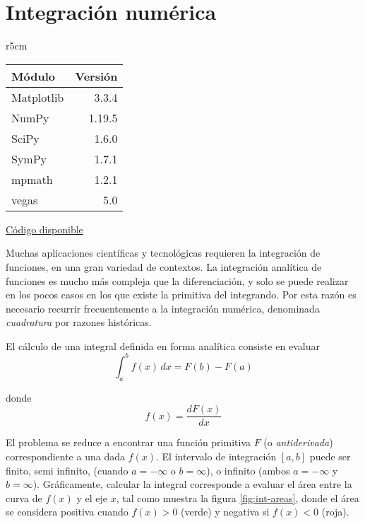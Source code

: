 

\chapter{Integración numérica} \label{ch:integracion}   

\begin{wraptable}{r}{5cm}
\begin{modulesinfo}
\begin{center}
{\small
    \begin{tabular}{l r}
        \toprule
        \textbf{Módulo} & \textbf{Versión} \\
        \midrule
        Matplotlib & 3.3.4 \\
        NumPy & 1.19.5 \\
        SciPy & 1.6.0 \\
        SymPy & 1.7.1 \\
        mpmath & 1.2.1 \\
        vegas & 5.0 \\
        \bottomrule
    \end{tabular}
    \vspace{0.75em}
    
    \href{https://github.com/facundobatista/libro-pyciencia/tree/master/código/integracion/}{Código disponible}
}
\end{center}
\end{modulesinfo}
\end{wraptable}
 
Muchas aplicaciones científicas y tecnológicas requieren la integración de funciones, en una gran variedad de contextos. La integración analítica de funciones es mucho más compleja que la diferenciación, y solo se puede realizar en los pocos casos en los que existe la primitiva del integrando. Por esta razón es necesario recurrir frecuentemente a la integración numérica, denominada \textit{cuadratura} por razones históricas.

El cálculo de una integral definida en forma analítica consiste en evaluar
\[ \int_a^b f(x) \, dx = F(b) - F(a)\]

donde 
\[ f(x) = \frac{dF(x)}{dx} \]

El problema se reduce a encontrar una función primitiva $F$ (o \textit{antiderivada}) correspondiente a una dada $f(x)$. El intervalo de integración $[a, b]$ puede ser finito, semi infinito, (cuando $a = -\infty$ o $b = \infty$), o infinito (ambos $a = -\infty$ y $b = \infty$). Gráficamente, calcular la integral corresponde a evaluar el área entre la curva de $f(x)$ y el eje $x$, tal como muestra la figura \ref{fig:int-areas}, donde el área se considera positiva cuando $f(x) > 0$ (verde) y negativa si $f(x) < 0$ (roja).

